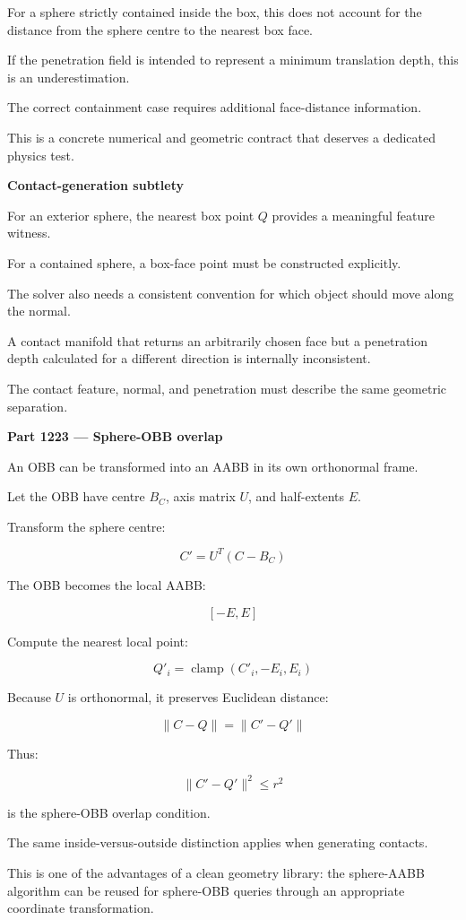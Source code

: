 For a sphere strictly contained inside the box, this does not account for the distance from the sphere centre to the nearest box face.

If the penetration field is intended to represent a minimum translation depth, this is an underestimation.

The correct containment case requires additional face-distance information.

This is a concrete numerical and geometric contract that deserves a dedicated physics test.

\textbf{Contact-generation subtlety}

For an exterior sphere, the nearest box point \(Q\) provides a meaningful feature witness.

For a contained sphere, a box-face point must be constructed explicitly.

The solver also needs a consistent convention for which object should move along the normal.

A contact manifold that returns an arbitrarily chosen face but a penetration depth calculated for a different direction is internally inconsistent.

The contact feature, normal, and penetration must describe the same geometric separation.

\textbf{Part 1223 --- Sphere-OBB overlap}

An OBB can be transformed into an AABB in its own orthonormal frame.

Let the OBB have centre \(B_C\), axis matrix \(U\), and half-extents \(E\).

Transform the sphere centre:

\[
\boxed{ C'=U^T(C-B_C) }
\]

The OBB becomes the local AABB:

\[
[-E,E]
\]

Compute the nearest local point:

\[
\boxed{ Q'_i=\operatorname{clamp}(C'_i,-E_i,E_i) }
\]

Because \(U\) is orthonormal, it preserves Euclidean distance:

\[
\|C-Q\|=\|C'-Q'\|
\]

Thus:

\[
\boxed{ \|C'-Q'\|^2\le r^2 }
\]

is the sphere-OBB overlap condition.

The same inside-versus-outside distinction applies when generating contacts.

This is one of the advantages of a clean geometry library: the sphere-AABB algorithm can be reused for sphere-OBB queries through an appropriate coordinate transformation.

